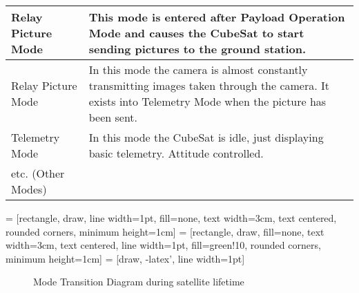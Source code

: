 \begin{table}[H]
{\begin{tabular}{|>{\raggedright\let\newline\\\arraybackslash\hspace{0pt}}m{3cm}|>{\arraybackslash}m{12.5cm}|}
            \\\hline
            Relay Picture Mode & This mode is entered after Payload Operation Mode and causes the CubeSat to start sending pictures to the ground station. 
            \\\hline
            Relay Picture Mode & In this mode the camera is almost constantly transmitting images taken through the camera.  It exists into Telemetry Mode when the picture has been sent. 
            \\\hline
            Telemetry Mode & In this mode the CubeSat is idle, just displaying basic telemetry.  Attitude controlled.
            \\\hline
            etc. (Other Modes) &   \\\hline
        \end{tabular} } 
\end{table}

 = [rectangle, draw, line width=1pt, fill=none, 
text width=3cm, text centered, rounded corners, minimum height=1cm]
 = [rectangle, draw, fill=none, 
text width=3cm, text centered, line width=1pt, fill=green!10, rounded corners, minimum height=1cm]
 = [draw, -latex', line width=1pt]

\begin{figure}[H] \centering
{}
\caption{Mode Transition Diagram during satellite lifetime}
\end{figure}

